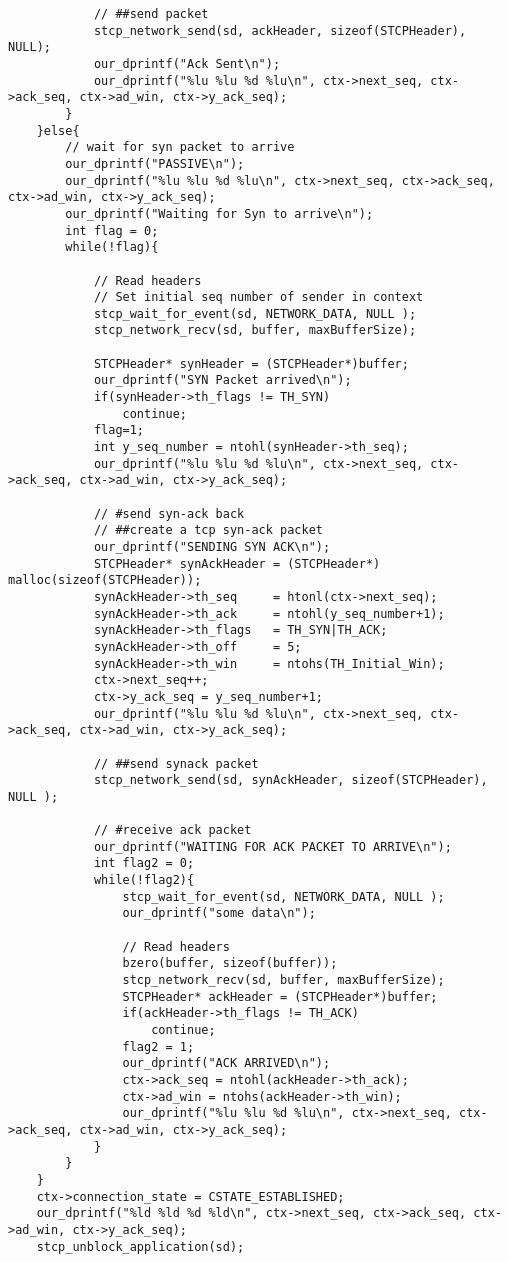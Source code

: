 \documentclass[11pt,a4paper,titlepage]{article}
\begin{document}
\begin{lstlisting}
			// ##send packet  
			stcp_network_send(sd, ackHeader, sizeof(STCPHeader), NULL);
			our_dprintf("Ack Sent\n");
			our_dprintf("%lu %lu %d %lu\n", ctx->next_seq, ctx->ack_seq, ctx->ad_win, ctx->y_ack_seq);
		}
	}else{
		// wait for syn packet to arrive 
		our_dprintf("PASSIVE\n");
		our_dprintf("%lu %lu %d %lu\n", ctx->next_seq, ctx->ack_seq, ctx->ad_win, ctx->y_ack_seq);
		our_dprintf("Waiting for Syn to arrive\n");
		int flag = 0;
		while(!flag){

			// Read headers
			// Set initial seq number of sender in context
			stcp_wait_for_event(sd, NETWORK_DATA, NULL );
			stcp_network_recv(sd, buffer, maxBufferSize);

			STCPHeader* synHeader = (STCPHeader*)buffer;
			our_dprintf("SYN Packet arrived\n");
			if(synHeader->th_flags != TH_SYN)
				continue;
			flag=1;
			int y_seq_number = ntohl(synHeader->th_seq);
			our_dprintf("%lu %lu %d %lu\n", ctx->next_seq, ctx->ack_seq, ctx->ad_win, ctx->y_ack_seq);
			
			// #send syn-ack back 
			// ##create a tcp syn-ack packet
			our_dprintf("SENDING SYN ACK\n");
			STCPHeader* synAckHeader = (STCPHeader*) malloc(sizeof(STCPHeader));
			synAckHeader->th_seq	 = htonl(ctx->next_seq);
			synAckHeader->th_ack     = ntohl(y_seq_number+1);
			synAckHeader->th_flags   = TH_SYN|TH_ACK;
			synAckHeader->th_off     = 5;
			synAckHeader->th_win     = ntohs(TH_Initial_Win);
			ctx->next_seq++;
			ctx->y_ack_seq = y_seq_number+1;
			our_dprintf("%lu %lu %d %lu\n", ctx->next_seq, ctx->ack_seq, ctx->ad_win, ctx->y_ack_seq);

			// ##send synack packet 
			stcp_network_send(sd, synAckHeader, sizeof(STCPHeader), NULL );

			// #receive ack packet
			our_dprintf("WAITING FOR ACK PACKET TO ARRIVE\n");
			int flag2 = 0;
			while(!flag2){
				stcp_wait_for_event(sd, NETWORK_DATA, NULL );
				our_dprintf("some data\n");

				// Read headers
				bzero(buffer, sizeof(buffer));
				stcp_network_recv(sd, buffer, maxBufferSize);
				STCPHeader* ackHeader = (STCPHeader*)buffer;
				if(ackHeader->th_flags != TH_ACK)
					continue;
				flag2 = 1;
				our_dprintf("ACK ARRIVED\n");
				ctx->ack_seq = ntohl(ackHeader->th_ack);
				ctx->ad_win = ntohs(ackHeader->th_win);
				our_dprintf("%lu %lu %d %lu\n", ctx->next_seq, ctx->ack_seq, ctx->ad_win, ctx->y_ack_seq);
			}
		}
	}
    ctx->connection_state = CSTATE_ESTABLISHED;
	our_dprintf("%ld %ld %d %ld\n", ctx->next_seq, ctx->ack_seq, ctx->ad_win, ctx->y_ack_seq);
    stcp_unblock_application(sd);


\end{lstlisting}
\end{document}
